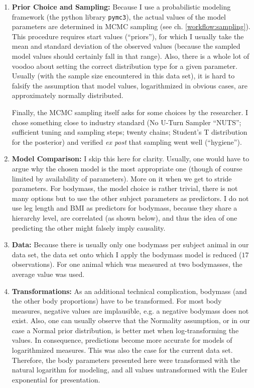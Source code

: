 \begin{enumerate}
\item \textbf{Prior Choice and Sampling:}
\label{sec:orgf31f4ce}
Because I use a probabilistic modeling framework (the python library \texttt{pymc3}), the actual values of the model parameters are determined in MCMC sampling (see ch. \ref{workflow:sampling}).
This procedure requires start values (``priors''), for which I usually take the mean and standard deviation of the observed values (because the sampled model values should certainly fall in that range).
Also, there is a whole lot of voodoo about setting the correct distribution type for a given parameter.
Usually (with the sample size encountered in this data set), it is hard to falsify the assumption that model values, logarithmized in obvious cases, are approximately normally distributed.

Finally, the MCMC sampling itself asks for some choices by the researcher.
I chose something close to industry standard (No U-Turn Sampler ``NUTS''; sufficient tuning and sampling steps; twenty chains; Student's T distribution for the posterior) and verified \emph{ex post} that sampling went well (``hygiene'').

\item \textbf{Model Comparison:}
\label{sec:orgd46c837}
I skip this here for clarity.
Usually, one would have to argue why the chosen model is the most appropriate one (though of course limited by availability of parameters).
More on it when we get to stride parameters.
For bodymass, the model choice is rather trivial, there is not many options but to use the other subject parameters as predictors.
I do not use leg length and BMI as predictors for bodymass, because they share a hierarchy level, are correlated (as shown below), and thus the idea of one predicting the other might falsely imply causality.

\item \textbf{Data:}
\label{sec:org71ae22a}
Because there is usually only one bodymass per subject animal in our data set, the data set onto which I apply the bodymass model is reduced (\(17\) observations).
For one animal which was measured at two bodymasses, the average value was used.

\item \textbf{Transformations:}
\label{sec:org1dc49e0}
As an additional technical complication, bodymass (and the other body proportions) have to be transformed.
For most body measures, negative values are implausible, e.g. a negative bodymass does not exist.
Also, one can usually observe that the Normality assumption, or in our case a Normal prior distribution, is better met when log-transforming the values.
In consequence, predictions become more accurate for models of logarithmized measures.
This was also the case for the current data set.
Therefore, the body parameters presented here were transformed with the natural logarithm for modeling, and all values untransformed with the Euler exponential for presentation.
\end{enumerate}


